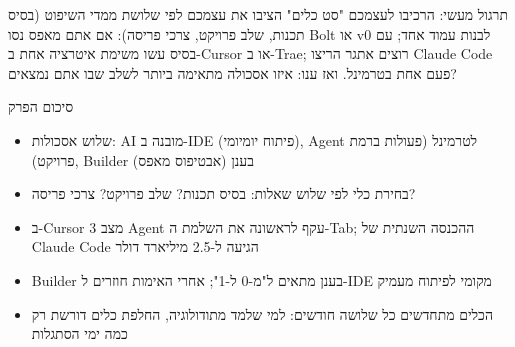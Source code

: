 \begin{tcbpractice}{תרגול מעשי: הרכיבו לעצמכם "סט כלים"}
הציבו את עצמכם לפי שלושת ממדי השיפוט (בסיס תכנות, שלב פרויקט, צרכי פריסה): אם אתם מאפס נסו Bolt או v0 לבנות עמוד אחד; עם בסיס עשו משימת איטרציה אחת ב-Cursor או ב-Trae; רוצים אתגר הריצו Claude Code פעם אחת בטרמינל. ואז ענו: איזו אסכולה מתאימה ביותר לשלב שבו אתם נמצאים?

\end{tcbpractice}

\begin{tcbsummary}{סיכום הפרק}
\begin{itemize}
  \item שלוש אסכולות: AI מובנה ב-IDE (פיתוח יומיומי), Agent לטרמינל (פעולות ברמת פרויקט), Builder בענן (אבטיפוס מאפס)
  \item בחירת כלי לפי שלוש שאלות: בסיס תכנות? שלב פרויקט? צרכי פריסה?
  \item ב-Cursor 3 מצב Agent עקף לראשונה את השלמת ה-Tab; ההכנסה השנתית של Claude Code הגיעה ל-2.5 מיליארד דולר
  \item Builder בענן מתאים ל"מ-0 ל-1"; אחרי האימות חוזרים ל-IDE מקומי לפיתוח מעמיק
  \item הכלים מתחדשים כל שלושה חודשים: למי שלמד מתודולוגיה, החלפת כלים דורשת רק כמה ימי הסתגלות
\end{itemize}

\end{tcbsummary}

